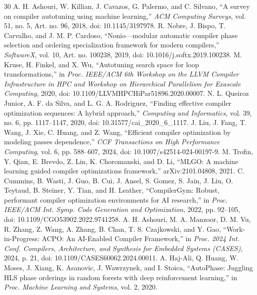 \begin{thebibliography}{30}\small
{} A. H. Ashouri, W. Killian, J. Cavazos, G. Palermo, and C. Silvano, ``A survey on compiler autotuning using machine learning,'' \textit{ACM Computing Surveys}, vol. 51, no. 5, Art. no. 96, 2018, doi: 10.1145/3197978.
 R. Nobre, J. Bispo, T. Carvalho, and J. M. P. Cardoso, ``Nonio---modular automatic compiler phase selection and ordering specialization framework for modern compilers,'' \textit{SoftwareX}, vol. 10, Art. no. 100238, 2019, doi: 10.1016/j.softx.2019.100238.
 M. Kruse, H. Finkel, and X. Wu, ``Autotuning search space for loop transformations,'' in \textit{Proc. IEEE/ACM 6th Workshop on the LLVM Compiler Infrastructure in HPC and Workshop on Hierarchical Parallelism for Exascale Computing}, 2020, doi: 10.1109/LLVMHPCHiPar51896.2020.00007.
 N. L. Queiroz Junior, A. F. da Silva, and L. G. A. Rodriguez, ``Finding effective compiler optimization sequences: A hybrid approach,'' \textit{Computing and Informatics}, vol. 39, no. 6, pp. 1117--1147, 2020, doi: 10.31577/cai\_2020\_6\_1117.
 J. Liu, J. Fang, T. Wang, J. Xie, C. Huang, and Z. Wang, ``Efficient compiler optimization by modeling passes dependence,'' \textit{CCF Transactions on High Performance Computing}, vol. 6, pp. 588--607, 2024, doi: 10.1007/s42514-024-00197-9.
 M. Trofin, Y. Qian, E. Brevdo, Z. Lin, K. Choromanski, and D. Li, ``MLGO: A machine learning guided compiler optimizations framework,'' arXiv:2101.04808, 2021.
 C. Cummins, B. Wasti, J. Guo, B. Cui, J. Ansel, S. Gomez, S. Jain, J. Liu, O. Teytaud, B. Steiner, Y. Tian, and H. Leather, ``CompilerGym: Robust, performant compiler optimization environments for AI research,'' in \textit{Proc. IEEE/ACM Int. Symp. Code Generation and Optimization}, 2022, pp. 92--105, doi: 10.1109/CGO53902.2022.9741258.
 A. H. Ashouri, M. A. Manzoor, D. M. Vu, R. Zhang, Z. Wang, A. Zhang, B. Chan, T. S. Czajkowski, and Y. Gao, ``Work-in-Progress: ACPO: An AI-Enabled Compiler Framework,'' in \textit{Proc. 2024 Int. Conf. Compilers, Architecture, and Synthesis for Embedded Systems (CASES)}, 2024, p. 21, doi: 10.1109/CASES60062.2024.00011.
 A. Haj-Ali, Q. Huang, W. Moses, J. Xiang, K. Asanovic, J. Wawrzynek, and I. Stoica, ``AutoPhase: Juggling HLS phase orderings in random forests with deep reinforcement learning,'' in \textit{Proc. Machine Learning and Systems}, vol. 2, 2020.

\end{thebibliography}
